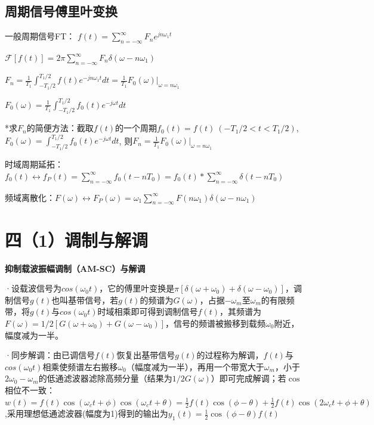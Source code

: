 \subsection*{周期信号傅里叶变换}

一般周期信号FT：
$f(t)\!=\!\sum_{n=-\infty}^{\infty}\!F_ne^{jn\omega_1 t}\!$

$\mathcal{F}[f(t)]\!=\!2\pi\!\sum_{n=-\infty}^{\infty}\!F_n\delta(\omega\!-\!n\omega_1)$

$F_n\!=\!\frac{1}{T_1}\!\int_{-T_1/2}^{T_1/2}\!\!f(t)e^{-jn\omega_1 t}dt\!=\!\frac{1}{T_1}F_0(\omega)\big|_{\omega=n\omega_1}\!$ 

$F_0(\omega)\!=\!\frac{1}{T_1}\!\int_{-T_1/2}^{T_1/2}\!\!f_0(t)e^{-j\omega t}dt$

*求$F_n$的简便方法：截取$f(t)$的一个周期$f_0(t)\!=\!f(t)\ (-T_1/2\!<\!t\!<\!T_1/2)$,
$F_0(\omega)\!=\!\int_{-T_1/2}^{T_1/2}\!\!f_0(t)e^{-j\omega t}dt$,
则$F_n\!=\!\frac{1}{T_1}F_0(\omega)\big|_{\omega=n\omega_1}$

时域周期延拓：$f_0(t) \leftrightarrow f_P(t)=\sum_{n=-\infty}^{\infty} f_0\left(t-n T_0\right)=f_0(t)*\sum_{n=-\infty}^{\infty} \delta\left(t-n T_0\right)$

频域离散化：$F(\omega) \leftrightarrow F_P(\omega) = \omega_1\sum_{n=-\infty}^{\infty}F(n\omega_1)\delta(\omega-n\omega_1)$

\section*{四（1）调制与解调}

\textbf{抑制载波振幅调制（AM-SC）与解调}

·设载波信号为$cos(\omega_0 t)$，它的傅里叶变换是$\pi [\delta(\omega + \omega_0) + \delta(\omega - \omega_0)]$，调制信号$g(t)$也叫基带信号，若$g(t)$的频谱为$G(\omega)$，占据$-\omega_m$至$\omega_m$的有限频带，将$g(t)$与$cos(\omega_0 t)$时域相乘即可得到调制信号$f(t)$，其频谱为$F(\omega)=1/2 [G(\omega + \omega_0) + G(\omega - \omega_0)]$，信号的频谱被搬移到载频$\omega_0$附近，幅度减为一半。

·同步解调：由已调信号$f(t)$恢复出基带信号$g(t)$的过程称为解调，$f(t)$与$cos(\omega_0 t)$相乘使频谱左右搬移$\omega_0$（幅度减为一半），再用一个带宽大于$\omega_m$，小于$2\omega_0 - \omega_m$的低通滤波器滤除高频分量（结果为$1/2G(\omega)$）即可完成解调；若$\cos$相位不一致：$w(t)=f(t)\cos(\omega_c t+\phi)\cos(\omega_c t+\theta)=\frac{1}{2}f(t)\cos(\phi-\theta)+\frac{1}{2}f(t)\cos(2\omega_c t+\phi+\theta)$,采用理想低通滤波器(幅度为1)得到的输出为$y_1(t)=\frac{1}{2}\cos(\phi-\theta) f(t)$


